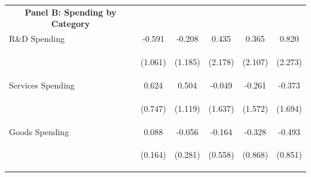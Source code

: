 \documentclass[dv_diss_main.tex]{subfiles}
\begin{document}
\begin{table}[H]
\begin{center}
{\begin{tabular}{lccccc}
    \multicolumn{1}{c}{\textbf{Panel B: Spending by Category}} \\ 
    R\&D Spending & -0.591 & -0.208 & 0.435 & 0.365 & 0.820 \\
    \vspace{4pt} & \begin{footnotesize}(1.061)\end{footnotesize} & \begin{footnotesize}(1.185)\end{footnotesize} & \begin{footnotesize}(2.178)\end{footnotesize} & \begin{footnotesize}(2.107)\end{footnotesize} & \begin{footnotesize}(2.273)\end{footnotesize} \\
    Services Spending & 0.624 & 0.504 & -0.049 & -0.261 & -0.373 \\
    \vspace{4pt} & \begin{footnotesize}(0.747)\end{footnotesize} & \begin{footnotesize}(1.119)\end{footnotesize} & \begin{footnotesize}(1.637)\end{footnotesize} & \begin{footnotesize}(1.572)\end{footnotesize} & \begin{footnotesize}(1.694)\end{footnotesize} \\
    Goods Spending & 0.088 & -0.056 & -0.164 & -0.328 & -0.493 \\
     & \begin{footnotesize}(0.164)\end{footnotesize} & \begin{footnotesize}(0.281)\end{footnotesize} & \begin{footnotesize}(0.558)\end{footnotesize} & \begin{footnotesize}(0.868)\end{footnotesize} & \begin{footnotesize}(0.851)\end{footnotesize} \\


\end{tabular}}
\end{center}
\end{table}
\end{document}
